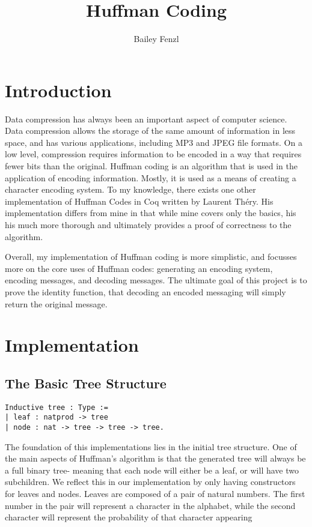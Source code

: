 \documentclass{llncs}
\begin{document}
\title{Huffman Coding}

\author{Bailey Fenzl}

\maketitle

\section{Introduction}

Data compression has always been an important aspect of computer science. Data compression allows the storage of the same amount of information in less space, and has various applications, including MP3 and JPEG file formats.  On a low level, compression requires information to be encoded in a way that requires fewer bits than the original. Huffman coding is an algorithm that is used in the application of encoding information. Mostly, it is used as a means of creating a character encoding system. 
To my knowledge, there exists one other implementation of Huffman Codes in Coq written by Laurent Théry. His implementation differs from mine in that while mine covers only the basics, his his much more thorough and ultimately provides a proof of correctness to the algorithm. 

Overall, my implementation of Huffman coding is more simplistic, and focusses more on the core uses of Huffman codes: generating an encoding system, encoding messages, and decoding messages. The ultimate goal of this project is to prove the identity function, that decoding an encoded messaging will simply return the original message.

\section{Implementation}

\subsection{The Basic Tree Structure}

\begin{lstlisting}
Inductive tree : Type :=
| leaf : natprod -> tree         
| node : nat -> tree -> tree -> tree. 
\end{lstlisting}

The foundation of this implementations lies in the initial tree structure. One of the main aspects of Huffman’s algorithm is that the generated tree will always be a full binary tree- meaning that  each node will either be a leaf, or will have two subchildren. We reflect this in our implementation by only having constructors for leaves and nodes. Leaves are composed of a pair of natural numbers. The first number in the pair will represent a character in the alphabet, while the second character will represent the probability of that character appearing 
\end{document}
